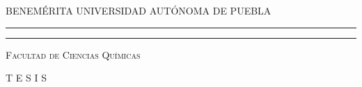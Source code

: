 \begin{minipage}[c][9.5cm][s]{10cm}
  \begin{center}
    {\Large \scshape BENEMÉRITA UNIVERSIDAD AUTÓNOMA DE PUEBLA}
    \vspace{.3cm}
	  \textcolor{-red!75!green!50}{\hrule height2pt}
    \vspace{.1cm}
	  \textcolor{-red!75!green!50}{\hrule height1pt}
    \vspace{.3cm}
     {\large \scshape Facultad de Ciencias Químicas}\\
     
     \vspace{.1cm}

     {\large \scshape \lacarrera}

     
     \vspace{0.8cm}

     {\huge T E S I S} \\[0.8cm]
    
     {\huge \eltitulo} \\
    
     \vspace{0.8cm}

    
     \vspace{0.8cm}
    
    
     \vspace{0.8cm}


     \vspace{0.8cm}
    

     \vspace{1.8cm}
     
  \end{center}
\end{minipage}
\newpage
